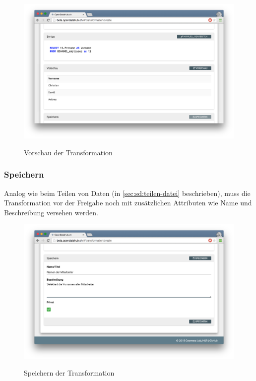 \begin{figure}[H]
	\centering
	\includegraphics[width=\linewidth]{fig/screenshot-vorschau}
	\label{fig:sd:screenshot-vorschau}
	\caption{Vorschau der Transformation}
\end{figure}


\subsubsection{Speichern}
 
 Analog wie beim Teilen von Daten (in \vref{sec:sd:teilen-datei} beschrieben), muss die Transformation vor der Freigabe noch mit zusätzlichen Attributen wie Name und Beschreibung versehen werden.

\begin{figure}[H]
	\centering
	\includegraphics[width=\linewidth]{fig/screenshot-transformation-speichern}
	\label{fig:sd:screenshot-transformation-speichern}
	\caption{Speichern der Transformation}
\end{figure}


